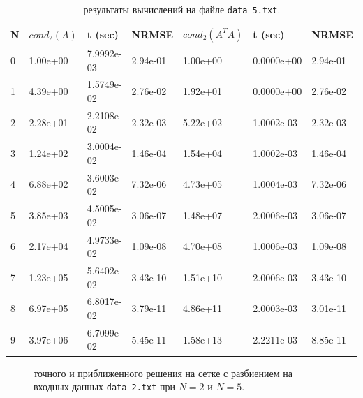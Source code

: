 \documentclass{article}
\begin{document}
\begin{table}[h!]
\begin{tabular}{|l||l|l|l||l|l|l|}
\hline
N & $cond_2(A)$ & t (sec)    & NRMSE    & $cond_2(A^TA)$ & t (sec)    & NRMSE    \\ \hline
0 & 1.00e+00   & 7.9992e-03 & 2.94e-01 & 1.00e+00                       & 0.0000e+00 & 2.94e-01 \\ \hline
1 & 4.39e+00   & 1.5749e-02 & 2.76e-02 & 1.92e+01                       & 0.0000e+00 & 2.76e-02 \\ \hline
2 & 2.28e+01   & 2.2108e-02 & 2.32e-03 & 5.22e+02                       & 1.0002e-03 & 2.32e-03 \\ \hline
3 & 1.24e+02   & 3.0004e-02 & 1.46e-04 & 1.54e+04                       & 1.0002e-03 & 1.46e-04 \\ \hline
4 & 6.88e+02   & 3.6003e-02 & 7.32e-06 & 4.73e+05                       & 1.0004e-03 & 7.32e-06 \\ \hline
5 & 3.85e+03   & 4.5005e-02 & 3.06e-07 & 1.48e+07                       & 2.0006e-03 & 3.06e-07 \\ \hline
6 & 2.17e+04   & 4.9733e-02 & 1.09e-08 & 4.70e+08                       & 1.0006e-03 & 1.09e-08 \\ \hline
7 & 1.23e+05   & 5.6402e-02 & 3.43e-10 & 1.51e+10                       & 2.0006e-03 & 3.43e-10 \\ \hline
8 & 6.97e+05   & 6.8017e-02 & 3.79e-11 & 4.86e+11                       & 2.0003e-03 & 3.01e-11 \\ \hline
9 & 3.97e+06   & 6.7099e-02 & 5.45e-11 & 1.58e+13                       & 2.2211e-03 & 8.85e-11 \\ \hline
\end{tabular}
\caption{результаты вычислений на файле \texttt{data\_5.txt}.}
\end{table}

\begin{figure}[H]
  \centering
  \hfill
  \caption{ точного и приближенного решения на сетке с разбиением на входных данных \texttt{data\_2.txt} при $N = 2$ и $N = 5$.}
\end{figure}
\end{document}
